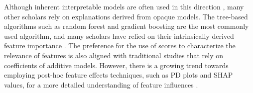 Although inherent interpretable models are often used in this direction \cite{Adeodato2016DATADATAb, Martinez-Abad2020EducationalAssessment}  \cite{Gamazo2020AnTechniques}, many other scholars rely on explanations derived from opaque models. The tree-based algorithms such as random forest and gradient boosting are the most commonly used \cite{Gamazo2020AnTechniques} algorithm, and many scholars have relied on their intrinsically derived feature importance  \cite{Maia2021AssessingMethods, Rebai2020ATunisia, Masci2018StudentApproach, Lezhnina2022CombiningPISA, Chang2018ClusterEconomies, Martinez-Abad2019IdentificationApproach, Gabriel2018ALiteracy, Rodrigues2021DataExamination, KlcDepren2017IdentifyingTIMSS, Hu2022DiscoveryApproach, Chen2021SynergisticLiteracy}. The preference for the use of scores to characterize the relevance of features is also aligned with traditional studies that rely on coefficients of additive models. However, there is a growing trend towards employing post-hoc feature effects techniques, such as \gls{PD} plots and \gls{SHAP} values, for a more detailed understanding of feature influences \cite{Lezhnina2022CombiningPISA, Masci2018StudentApproach, Rebai2020ATunisia, Schiltz2018UsingApproach}.



